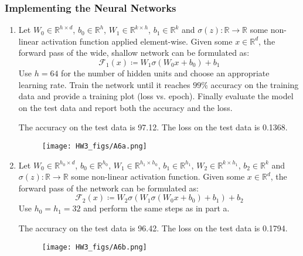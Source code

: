 \documentclass{article}
\begin{document}
\begin{aprob}
    \subsubsection*{Implementing the Neural Networks}
    \begin{enumerate}
        \item {}
        Let $W_0 \in \mathbb{R}^{h \times d}$, $b_0 \in \mathbb{R}^h$, $W_1 \in \mathbb{R}^{k \times h}$, $b_1 \in \mathbb{R}^k$ and $\sigma(z)\colon \mathbb{R} \to \mathbb{R}$
        some non-linear activation function applied element-wise. Given some $x \in \mathbb{R}^{d}$, the forward pass of the wide, shallow network can be formulated as:
        $$\mathcal{F}_1(x) \coloneqq W_1 \sigma(W_0 x + b_0) + b_1$$
        Use $h=64$ for the number of hidden units and choose an appropriate learning rate.
        Train the network until it reaches $99\%$ accuracy on the training data and provide a training plot (loss vs. epoch).
        Finally evaluate the model on the test data and report both the accuracy and the loss.
        
        The accuracy on the test data is 97.12. The loss on the test data is 0.1368. 
        
        \begin{figure}[htp] 
        \centering
        \vspace*{-0.1in}
        \texttt{[image: HW3\_figs/A6a.png]}
        \label{figs:A6a.png}
        \end{figure}
    
        \item {}
        Let $W_0 \in \mathbb{R}^{h_0 \times d}$, $b_0 \in \mathbb{R}^{h_0}$, $W_1 \in \mathbb{R}^{h_1 \times h_0}$, $b_1 \in \mathbb{R}^{h_1}$,
        $W_2 \in \mathbb{R}^{k \times h_1}$, $b_2 \in \mathbb{R}^{k}$ and $\sigma(z) : \mathbb{R} \rightarrow \mathbb{R}$
        some non-linear activation function. Given some $x \in \mathbb{R}^{d}$, the forward pass of the network can be formulated as:
        $$\mathcal{F}_2(x) \coloneqq W_2 \sigma(W_1 \sigma(W_0 x + b_0) + b_1) + b_2$$
        Use $h_0 = h_1 = 32$ and perform the same steps as in part a.
        
        The accuracy on the test data is 96.42. The loss on the test data is 0.1794.
        \begin{figure}[htp] 
        \centering
        \vspace*{-0.1in}
        \texttt{[image: HW3\_figs/A6b.png]}
        \label{figs:A6b.png}
        \end{figure}


\end{enumerate}
\end{aprob}
\end{document}
